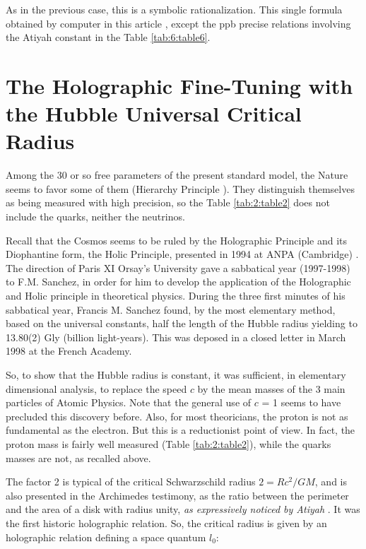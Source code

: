 \documentclass[a4paper,9pt]{article}
\begin{document}
As in the previous case, this is a symbolic rationalization. This single formula obtained by computer in this article \cite{LaGuer}, except the ppb precise relations involving the Atiyah constant in the Table \ref{tab:6:table6}.








\section{The Holographic Fine-Tuning with the Hubble Universal Critical Radius}

Among the 30 or so free parameters of the present standard model, the Nature seems to favor some of them (Hierarchy Principle \cite{Sanchez}). They distinguish themselves as being measured with high precision, so the Table \ref{tab:2:table2} does not include the quarks, neither the neutrinos. 

Recall that the Cosmos seems to be ruled by the Holographic Principle and its Diophantine form, the Holic Principle, presented in 1994 at ANPA (Cambridge)  \cite{Sanchez1}. The direction of Paris XI Orsay's University gave a sabbatical year (1997-1998) to F.M. Sanchez, in order for him to develop the application of the Holographic and Holic principle in theoretical physics. During the three first minutes of his sabbatical year, Francis M. Sanchez found, by the most elementary method, based on the universal constants, half the length of the Hubble radius yielding to 13.80(2) Gly (billion light-years). This was deposed in a closed letter in March 1998 at the French Academy. 


So, to show that the Hubble radius is constant, it was sufficient, in elementary dimensional analysis, to replace the speed $c$ by the mean masses of the 3 main particles of Atomic Physics. Note that the general use of $c$ = 1 seems to have precluded this discovery before. Also, for most theoricians, the proton is not as fundamental as the electron. But this is a reductionist point of view. In fact, the proton mass is fairly well measured (Table \ref{tab:2:table2}), while the quarks masses are not, as recalled above.
 
 
    The factor 2 is typical of the critical Schwarzschild radius $2 = Rc^2/GM$, and is also presented in the Archimedes testimony, as the ratio between the perimeter and the area of a disk with radius unity, \textit {as expressively noticed by Atiyah }. It was the first historic holographic relation. So, the critical radius is given by an holographic relation defining a space quantum $l_0$:
    
\end{document}
